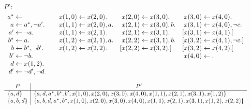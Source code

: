 \begin{Loesung}%
\rm
\begin{UList}
\item $P':{}$
\begin{equation*}
\begin{array}[t]{r@{{}\leftarrow{}}l@{\qquad}r@{{}\leftarrow{}}l@{\quad}r@{{}\leftarrow{}}l@{\quad}r@{{}\leftarrow{}}l}
a^* &
&
\mathit{x}(1,0) & \mathit{x}(2,0).
&
\mathit{x}(2,0) & \mathit{x}(3,0).
&
\mathit{x}(3,0) & \mathit{x}(4,0).
\\
a & a^*, \neg a'. %
&
\mathit{x}(1,1) & \mathit{x}(2,0), a.
&
\mathit{x}(2,1) & \mathit{x}(3,0), b.
&
\mathit{x}(3,1) & \mathit{x}(4,0), \neg c.
\\
a' & \neg{a}.
&
\mathit{x}(1,1) & \mathit{x}(2,1).
&
\mathit{x}(2,1) & \mathit{x}(3,1).
&
[\mathit{x}(3,1) & \mathit{x}(4,1).]
\\
b^* & a.
&
\mathit{x}(1,2) & \mathit{x}(2,1), a.
&
\mathit{x}(2,2) & \mathit{x}(3,1), b.
&
[\mathit{x}(3,2) & \mathit{x}(4,1), \neg c.]
\\
b & b^*, \neg b'.
&
\mathit{x}(1,2) & \mathit{x}(2,2).
&
[\mathit{x}(2,2) & \mathit{x}(3,2).]
&

[\mathit{x}(3,2) & \mathit{x}(4,2).]
\\
b' &    \neg b. 
& \multicolumn{5}{r@{{}\leftarrow{}}}{x(4,0)} & .%
\\
d & x(1,2). 
\\
d' & \neg d', \neg d.
\end{array}
\end{equation*}


\item
\begin{equation*}
\begin{array}{l|l}
\multicolumn{1}{c|}{P} & \multicolumn{1}{c}{P'}
\\\hline
\{a,d\}
&
\{a,d,a^*,b^*,b',\mathit{x}(1,0),\mathit{x}(2,0),\mathit{x}(3,0),\mathit{x}(4,0),\mathit{x}(1,1),\mathit{x}(2,1),
\mathit{x}(3,1),\mathit{x}(1,2)\}
\\
\{a,b,d\}
&
\{a,b,d,a^*,b^*,\mathit{x}(1,0),\mathit{x}(2,0),\mathit{x}(3,0),\mathit{x}(4,0),\mathit{x}(1,1),\mathit{x}(2,1),
\mathit{x}(3,1),\mathit{x}(1,2),\mathit{x}(2,2)\}
\end{array}
\end{equation*}
\end{UList}
\newpage
\end{Loesung}


